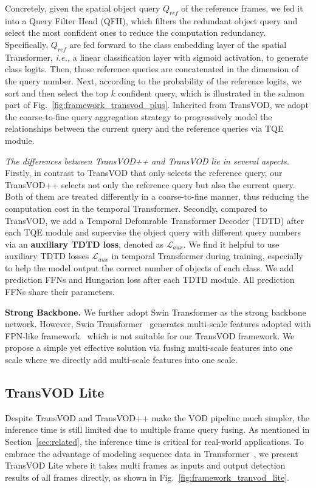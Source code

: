 \documentclass[10pt,journal,compsoc]{IEEEtran}
\begin{document}
Concretely, given the spatial object query $Q_{ref}$ of the reference frames, we fed it into a Query Filter Head (QFH), which filters the redundant object query and select the most confident ones to reduce the computation redundancy. Specifically, $Q_{ref}$ are fed forward to the class embedding layer of the spatial Transformer, \emph{i.e.,} a linear classification layer with sigmoid activation, to generate class logits. Then, those reference queries are concatenated in the dimension of the query number. Next, according to the probability of the reference logits, we sort and then select the top $k$ confident query, which is illustrated in the salmon part of Fig.~\ref{fig:framework_transvod_plus}. Inherited from TransVOD, we adopt the coarse-to-fine query aggregation strategy to progressively model the relationships between the current query and the reference queries via TQE module.


\textit{The differences between TransVOD++ and TransVOD lie in several aspects.}
Firstly, in contrast to TransVOD that only selects the reference query, our TransVOD++ selects not only the reference query but also the current query. Both of them are treated differently in a coarse-to-fine manner, thus reducing the computation cost in the temporal Transformer. Secondly, compared to TransVOD, we add a Temporal Defomrable Transformer Decoder (TDTD) after each TQE module and supervise the object query with different query numbers via an \textbf{auxiliary TDTD loss}, denoted as $\mathcal{L}_{aux}$. We find it helpful to use auxiliary TDTD losses $\mathcal{L}_{aux}$ in temporal Transformer during training, especially to help the model output the correct number of objects of each class. We add prediction FFNs and Hungarian loss after each TDTD module. All prediction FFNs share their parameters. 



\noindent
\textbf{Strong Backbone.} We further adopt Swin Transformer as the strong backbone network. However, Swin Transformer~\cite{liu2021swin} generates multi-scale features adopted with FPN-like framework~\cite{he17maskrcnn} which is not suitable for our TransVOD framework. We propose a simple yet effective solution via fusing multi-scale features into one scale where we directly add multi-scale features into one scale.

\subsection{TransVOD Lite}
\label{sec:TransVOD_lite}
Despite TransVOD and TransVOD++ make the VOD pipeline much simpler, the inference time is still limited due to multiple frame query fusing. As mentioned in Section~\ref{sec:related}, the inference time is critical for real-world applications. To embrace the advantage of modeling sequence data in Transformer~\cite{vaswani2017attention,wang2020end}, we present TransVOD Lite where it takes multi frames as inputs and output detection results of all frames directly, as shown in Fig.~\ref{fig:framework_tranvod_lite}. 
\end{document}
